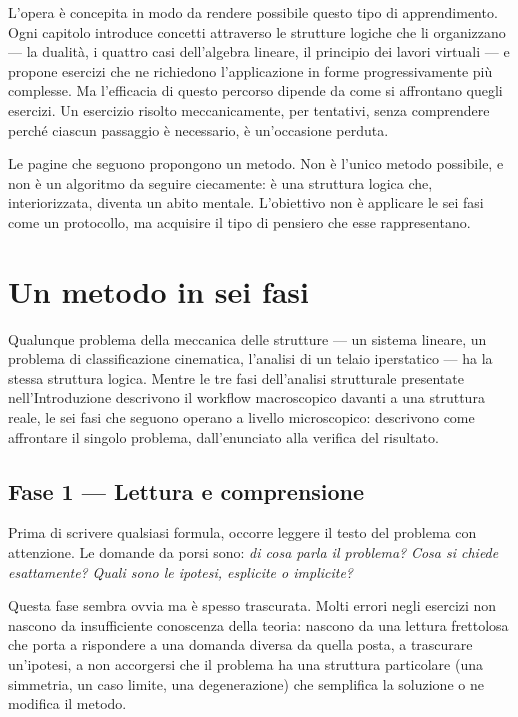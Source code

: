 L'opera è concepita in modo da rendere possibile questo tipo di apprendimento. Ogni capitolo introduce concetti attraverso le strutture logiche che li organizzano --- la dualità, i quattro casi dell'algebra lineare, il principio dei lavori virtuali --- e propone esercizi che ne richiedono l'applicazione in forme progressivamente più complesse. Ma l'efficacia di questo percorso dipende da come si affrontano quegli esercizi. Un esercizio risolto meccanicamente, per tentativi, senza comprendere perché ciascun passaggio è necessario, è un'occasione perduta.

Le pagine che seguono propongono un metodo. Non è l'unico metodo possibile, e non è un algoritmo da seguire ciecamente: è una struttura logica che, interiorizzata, diventa un abito mentale. L'obiettivo non è applicare le sei fasi come un protocollo, ma acquisire il tipo di pensiero che esse rappresentano.


\section*{Un metodo in sei fasi}

Qualunque problema della meccanica delle strutture --- un sistema lineare, un problema di classificazione cinematica, l'analisi di un telaio iperstatico --- ha la stessa struttura logica. Mentre le tre fasi dell'analisi strutturale presentate nell'Introduzione descrivono il workflow macroscopico davanti a una struttura reale, le sei fasi che seguono operano a livello microscopico: descrivono come affrontare il singolo problema, dall'enunciato alla verifica del risultato.


\subsection*{Fase 1 --- Lettura e comprensione}

Prima di scrivere qualsiasi formula, occorre leggere il testo del problema con attenzione. Le domande da porsi sono: \textit{di cosa parla il problema?} \textit{Cosa si chiede esattamente?} \textit{Quali sono le ipotesi, esplicite o implicite?}

Questa fase sembra ovvia ma è spesso trascurata. Molti errori negli esercizi non nascono da insufficiente conoscenza della teoria: nascono da una lettura frettolosa che porta a rispondere a una domanda diversa da quella posta, a trascurare un'ipotesi, a non accorgersi che il problema ha una struttura particolare (una simmetria, un caso limite, una degenerazione) che semplifica la soluzione o ne modifica il metodo.

